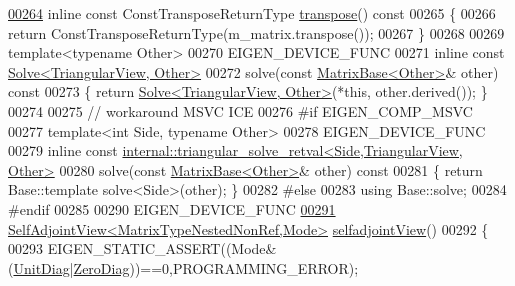 \begin{DoxyCode}
\hyperlink{group___core___module_a202b574fc82f1433989c3ae35128451e}{00264}     \textcolor{keyword}{inline} \textcolor{keyword}{const} ConstTransposeReturnType \hyperlink{group___core___module_a202b574fc82f1433989c3ae35128451e}{transpose}()\textcolor{keyword}{ const}
00265 \textcolor{keyword}{    }\{
00266       \textcolor{keywordflow}{return} ConstTransposeReturnType(m\_matrix.transpose());
00267     \}
00268 
00269     \textcolor{keyword}{template}<\textcolor{keyword}{typename} Other>
00270     EIGEN\_DEVICE\_FUNC
00271     \textcolor{keyword}{inline} \textcolor{keyword}{const} \hyperlink{group___core___module_class_eigen_1_1_solve}{Solve<TriangularView, Other>} 
00272     solve(\textcolor{keyword}{const} \hyperlink{group___core___module_class_eigen_1_1_matrix_base}{MatrixBase<Other>}& other)\textcolor{keyword}{ const}
00273 \textcolor{keyword}{    }\{ \textcolor{keywordflow}{return} \hyperlink{group___core___module_class_eigen_1_1_solve}{Solve<TriangularView, Other>}(*\textcolor{keyword}{this}, other.derived()); \}
00274     
00275   \textcolor{comment}{// workaround MSVC ICE}
00276 \textcolor{preprocessor}{  #if EIGEN\_COMP\_MSVC}
00277     \textcolor{keyword}{template}<\textcolor{keywordtype}{int} S\textcolor{keywordtype}{id}e, \textcolor{keyword}{typename} Other>
00278     EIGEN\_DEVICE\_FUNC
00279     \textcolor{keyword}{inline} \textcolor{keyword}{const} \hyperlink{struct_eigen_1_1internal_1_1triangular__solve__retval}{internal::triangular\_solve\_retval<Side,TriangularView, Other>}
00280     solve(\textcolor{keyword}{const} \hyperlink{group___core___module_class_eigen_1_1_matrix_base}{MatrixBase<Other>}& other)\textcolor{keyword}{ const}
00281 \textcolor{keyword}{    }\{ \textcolor{keywordflow}{return} Base::template solve<Side>(other); \}
00282 \textcolor{preprocessor}{  #else}
00283     \textcolor{keyword}{using} Base::solve;
00284 \textcolor{preprocessor}{  #endif}
00285 
00290     EIGEN\_DEVICE\_FUNC
\hyperlink{group___core___module_a1fe2e5e93164b2efb5124297b096fb10}{00291}     \hyperlink{group___core___module_class_eigen_1_1_self_adjoint_view}{SelfAdjointView<MatrixTypeNestedNonRef,Mode>} 
      \hyperlink{group___core___module_a1fe2e5e93164b2efb5124297b096fb10}{selfadjointView}()
00292     \{
00293       EIGEN\_STATIC\_ASSERT((Mode&(\hyperlink{group__enums_gga39e3366ff5554d731e7dc8bb642f83cdaddb72f888ac85d5a1c52333e54f9374b}{UnitDiag}|\hyperlink{group__enums_gga39e3366ff5554d731e7dc8bb642f83cda884ff7240392e85aa6e4b3c957e36483}{ZeroDiag}))==0,PROGRAMMING\_ERROR);

\end{DoxyCode}
